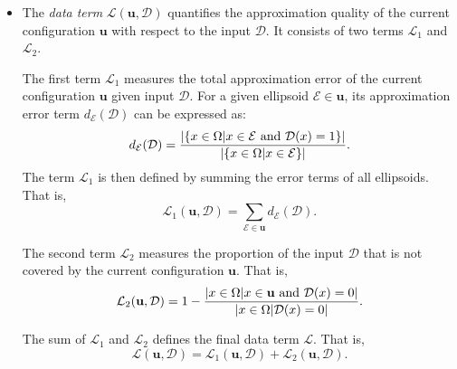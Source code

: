 \documentclass[journal]{IEEEtran}
\begin{document}
\begin{itemize}
\item The \textit{data term} $\mathcal{L}(\mathbf{u}, \mathcal{D})$
  quantifies the approximation quality of the current configuration
  $\mathbf{u}$ with respect to the input $\mathcal{D}$. It consists of
  two terms $\mathcal{L}_1$ and $\mathcal{L}_2$.

  The first term $\mathcal{L}_1$ measures the total approximation
  error of the current configuration $\mathbf{u}$ given input
  $\mathcal{D}$. For a given ellipsoid $\mathcal{E} \in \mathbf{u}$,
  its approximation error term $d_{\mathcal{E}}(\mathcal{D})$ can be
  expressed as:
  \begin{equation}
    \label{eq:data-term1-single}
    d_{\mathcal{E}}(\mathcal{D}) = \frac{ | \{ x \in \Omega | x \in
      \mathcal{E} \textnormal{ and } \mathcal{D}(x) = 1\} | } { |\{ x
      \in \Omega | x \in \mathcal{E} \}| }.
  \end{equation}
  The term $\mathcal{L}_1$ is then defined by summing the error terms
  of all ellipsoids. That is,
  \begin{equation}
    \label{eq:data-term1}
    \mathcal{L}_{1}(\mathbf{u}, \mathcal{D}) = \sum_{\mathcal{E} \in
      \mathbf{u}} d_{\mathcal{E}} (\mathcal{D}).
  \end{equation}

  The second term $\mathcal{L}_2$ measures the proportion of the input
  $\mathcal{D}$ that is not covered by the current configuration
  $\mathbf{u}$. That is,
  \begin{equation}
    \label{eq:data-term2}
    \mathcal{L}_{2}(\mathbf{u}, \mathcal{D}) = 1 -
    \frac{|x \in \Omega| x \in \mathbf{u} \textnormal{ and }
      \mathcal{D}(x) = 0|} {|x \in \Omega| \mathcal{D}(x) = 0|}.
  \end{equation}

  The sum of $\mathcal{L}_1$ and $\mathcal{L}_2$ defines the final
  data term $\mathcal{L}$. That is,
  \begin{equation}
    \label{eq:data-term-final}
    \mathcal{L}(\mathbf{u}, \mathcal{D}) = \mathcal{L}_{1}(\mathbf{u},
    \mathcal{D}) + \mathcal{L}_{2}(\mathbf{u}, \mathcal{D}).
  \end{equation}


\end{itemize}
\end{document}
